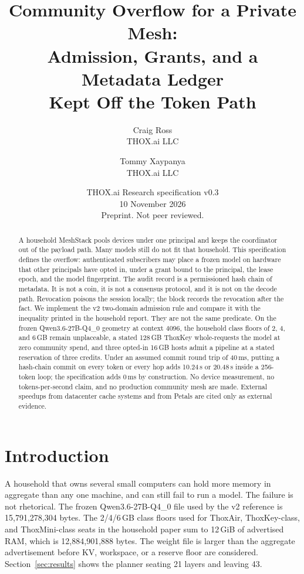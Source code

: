\documentclass[11pt]{article}
\title{Community Overflow for a Private Mesh:\\Admission, Grants, and a Metadata Ledger\\Kept Off the Token Path}
\author{Craig Ross\\THOX.ai LLC
\and
Tommy Xaypanya\\THOX.ai LLC}
\date{THOX.ai Research specification v0.3\\10 November 2026\\Preprint. Not peer reviewed.}
\begin{document}
\maketitle

\begin{abstract}
A household MeshStack pools devices under one principal and keeps the coordinator out of the payload path. Many models still do not fit that household. This specification defines the overflow: authenticated subscribers may place a frozen model on hardware that other principals have opted in, under a grant bound to the principal, the lease epoch, and the model fingerprint. The audit record is a permissioned hash chain of metadata. It is not a coin, it is not a consensus protocol, and it is not on the decode path. Revocation poisons the session locally; the block records the revocation after the fact. We implement the v2 two-domain admission rule and compare it with the inequality printed in the household report. They are not the same predicate. On the frozen Qwen3.6-27B-Q4\_0 geometry at context 4096, the household class floors of 2, 4, and 6\,GB remain unplaceable, a stated 128\,GB ThoxKey whole-requests the model at zero community spend, and three opted-in 16\,GB hosts admit a pipeline at a stated reservation of three credits. Under an assumed commit round trip of 40\,ms, putting a hash-chain commit on every token or every hop adds 10.24\,s or 20.48\,s inside a 256-token loop; the specification adds 0\,ms by construction. No device measurement, no tokens-per-second claim, and no production community mesh are made. External speedups from datacenter cache systems and from Petals are cited only as external evidence.
\end{abstract}

\section{Introduction}
A household that owns several small computers can hold more memory in aggregate than any one machine, and can still fail to run a model. The failure is not rhetorical. The frozen Qwen3.6-27B-Q4\_0 file used by the v2 reference is 15{,}791{,}278{,}304 bytes. The 2/4/6\,GB class floors used for ThoxAir, ThoxKey-class, and ThoxMini-class seats in the household paper sum to 12\,GiB of advertised RAM, which is 12{,}884{,}901{,}888 bytes. The weight file is larger than the aggregate advertisement before KV, workspace, or a reserve floor are considered. Section~\ref{sec:results} shows the planner seating 21 layers and leaving 43.
\end{document}
